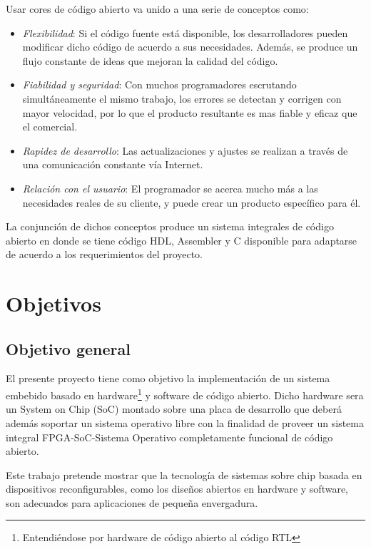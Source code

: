 Usar cores de código abierto va unido a una serie de conceptos como:
\begin{itemize}
\item \textit{Flexibilidad}: Si el código fuente está disponible, los
  desarrolladores pueden modificar dicho código de acuerdo a sus
  necesidades. Además, se produce un flujo constante de ideas que
  mejoran la calidad del código.
\item \textit{Fiabilidad y seguridad}: Con muchos programadores
  escrutando simultáneamente el mismo trabajo, los errores se detectan
  y corrigen con mayor velocidad, por lo que el producto resultante es
  mas fiable y eficaz que el comercial.
\item \textit{Rapidez de desarrollo}: Las actualizaciones y ajustes se
  realizan a través de una comunicación constante vía Internet.
\item \textit{Relación con el usuario}: El programador se acerca mucho
  más a las necesidades reales de su cliente, y puede crear un
  producto específico para él.
\end{itemize}

La conjunción de dichos conceptos produce un sistema integrales de
código abierto en donde se tiene código HDL, Assembler y C disponible
para adaptarse de acuerdo a los requerimientos del proyecto.


\section{Objetivos}
\subsection{Objetivo general}
El presente proyecto tiene como objetivo la implementación de un sistema embebido basado en hardware\footnote{Entendiéndose por hardware de código abierto al código RTL} y software de código abierto.
Dicho hardware sera un System on Chip (SoC) montado sobre una placa de desarrollo que deberá además soportar un sistema operativo
libre con la finalidad de proveer un sistema integral FPGA-SoC-Sistema
Operativo completamente funcional de código abierto.

Este trabajo pretende mostrar que la tecnología de sistemas sobre chip
basada en dispositivos reconfigurables, como los diseños abiertos en
hardware y software, son adecuados para aplicaciones de pequeña envergadura.

